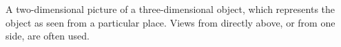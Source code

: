 A two-dimensional picture of a three-dimensional object, which 
represents the object as seen from a particular place. Views from
directly above, or from one side, are often used.